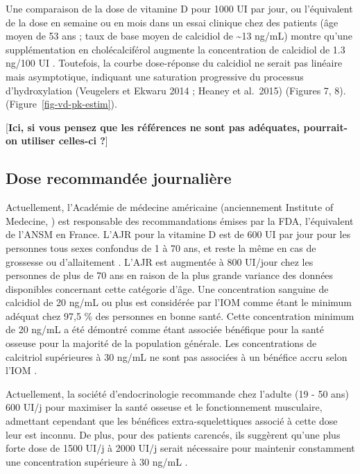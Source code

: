 \documentclass[
  a4paper,
  DIV=11,
  numbers=noendperiod,
  listof=totoc]{scrreprt}
\begin{document}
Une comparaison de la dose de vitamine D pour 1000 UI par jour, ou
l'équivalent de la dose en semaine ou en mois dans un essai clinique
chez des patients (âge moyen de 53 ans ; taux de base moyen de calcidiol
de \textasciitilde13 ng/mL) montre qu'une supplémentation en
cholécalciférol augmente la concentration de calcidiol de 1.3 ng/100 UI
\autocite{Bouillon.2017}. Toutefois, la courbe dose-réponse du calcidiol
ne serait pas linéaire mais asymptotique, indiquant une saturation
progressive du processus d'hydroxylation (Veugelers et Ekwaru 2014 ;
Heaney et al.~2015) (Figures 7, 8). (Figure~\ref{fig-vd-pk-estim}).

{[}\textbf{Ici, si vous pensez que les références ne sont pas adéquates,
pourrait-on utiliser celles-ci ?}{]}

\hypertarget{dose-recommanduxe9e-journaliuxe8re}{%
\subsection{Dose recommandée
journalière}\label{dose-recommanduxe9e-journaliuxe8re}}

Actuellement, l'Académie de médecine américaine (anciennement Institute
of Medecine, ) est responsable des recommandations émises par
la \ac{FDA}, l'équivalent de l'\ac{ANSM} en France. L'\ac{AJR} pour la
vitamine D est de 600 UI par jour pour les personnes tous sexes
confondus de 1 à 70 ans, et reste la même en cas de grossesse ou
d'allaitement \autocite{IOM.2011}. L'\ac{AJR} est augmentée à 800
UI/jour chez les personnes de plus de 70 ans en raison de la plus grande
variance des données disponibles concernant cette catégorie d'âge. Une
concentration sanguine de calcidiol de 20 ng/mL ou plus est considérée
par l'\ac{IOM} comme étant le minimum adéquat chez 97,5 \% des personnes
en bonne santé. Cette concentration minimum de 20 ng/mL a été démontré
comme étant associée bénéfique pour la santé osseuse pour la majorité de
la population générale. Les concentrations de calcitriol supérieures à
30 ng/mL ne sont pas associées à un bénéfice accru selon l'\ac{IOM}
\autocite[Caprio.2017]{IOM.2011}.

Actuellement, la société d'endocrinologie recommande chez l'adulte (19 -
50 ans) 600 UI/j pour maximiser la santé osseuse et le fonctionnement
musculaire, admettant cependant que les bénéfices extra-squelettiques
associé à cette dose leur est inconnu. De plus, pour des patients
carencés, ils suggèrent qu'une plus forte dose de 1500 UI/j à 2000 UI/j
serait nécessaire pour maintenir constamment une concentration
supérieure à 30 ng/mL \autocite{Holick.2011}.
\end{document}
